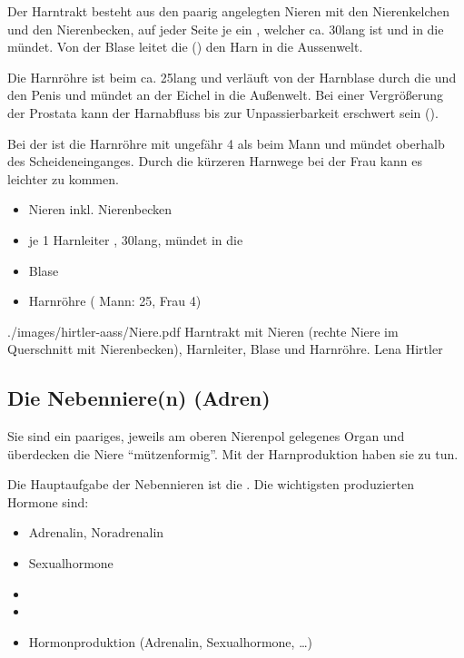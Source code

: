 {%
Der Harntrakt besteht aus den paarig angelegten
Nieren mit den Nierenkelchen und den Nierenbecken, auf jeder
Seite je ein   , welcher ca.
30\CM* lang ist und in die
 mündet. Von der Blase leitet die
 () den Harn in die Aussenwelt.

Die Harnröhre ist beim  ca. 25\CM* lang und
verläuft von der Harnblase durch die 
 und den Penis und mündet an der
Eichel in die Außenwelt. Bei einer Vergrößerung der Prostata
kann der Harnabfluss bis zur Unpassierbarkeit erschwert sein
().

Bei der  ist die Harnröhre mit ungefähr 4\CM*
{} als beim Mann und mündet oberhalb des
Scheideneinganges. Durch die kürzeren Harnwege bei der Frau kann es 
leichter zu  kommen.
}
{
\begin{itemize}
    \item Nieren inkl. Nierenbecken
    \item {}je 1 Harnleiter 
    , 30\CM* lang, mündet  in die 
    \item {}Blase 
    \item Harnröhre  ( Mann: 25\CM*, Frau
    4\CM*)
\end{itemize}
}
{./images/hirtler-aass/Niere.pdf}
{Harntrakt
mit Nieren (rechte Niere im Querschnitt mit Nierenbecken),
Harnleiter, Blase und Harnröhre. \label{fig:harntrakt}}
{Lena Hirtler}




\subsection{Die Nebenniere(n) (Adren)}


{%
Sie sind ein paariges, jeweils am oberen Nierenpol
gelegenes Organ und überdecken die Niere \enquote{mützenformig}.
Mit der Harnproduktion haben sie  zu tun. 

Die Hauptaufgabe der Nebennieren ist die
.  Die wichtigsten
produzierten Hormone sind:

\begin{itemize}
    \item Adrenalin, Noradrenalin
    \item Sexualhormone 
    \item {}
    \item {}
\end{itemize}

}{%
\begin{itemize}
  \item Hormonproduktion (Adrenalin, Sexualhormone, \ldots)
\end{itemize}
}{}{}{}




